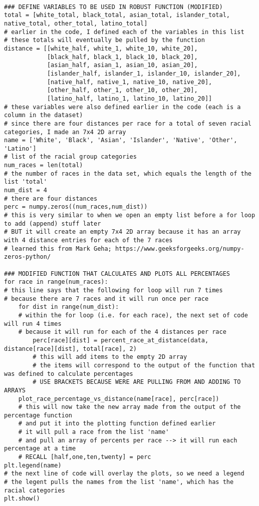 \documentclass[letterpaper]{article}
\begin{document}
\lstset{language=Python}
\begin{lstlisting}[frame=single]

### DEFINE VARIABLES TO BE USED IN ROBUST FUNCTION (MODIFIED)
total = [white_total, black_total, asian_total, islander_total, native_total, other_total, latino_total]
# earlier in the code, I defined each of the variables in this list
# these totals will eventually be pulled by the function
distance = [[white_half, white_1, white_10, white_20],
            [black_half, black_1, black_10, black_20],
            [asian_half, asian_1, asian_10, asian_20],
            [islander_half, islander_1, islander_10, islander_20],
            [native_half, native_1, native_10, native_20],
            [other_half, other_1, other_10, other_20],
            [latino_half, latino_1, latino_10, latino_20]]
# these variables were also defined earlier in the code (each is a column in the dataset)
# since there are four distances per race for a total of seven racial categories, I made an 7x4 2D array
name = ['White', 'Black', 'Asian', 'Islander', 'Native', 'Other', 'Latino']
# list of the racial group categories
num_races = len(total)
# the number of races in the data set, which equals the length of the list 'total'
num_dist = 4
# there are four distances
perc = numpy.zeros((num_races,num_dist))
# this is very similar to when we open an empty list before a for loop to add (append) stuff later
# BUT it will create an empty 7x4 2D array because it has an array with 4 distance entries for each of the 7 races
# learned this from Mark Geha; https://www.geeksforgeeks.org/numpy-zeros-python/

### MODIFIED FUNCTION THAT CALCULATES AND PLOTS ALL PERCENTAGES
for race in range(num_races):
# this line says that the following for loop will run 7 times
# because there are 7 races and it will run once per race
    for dist in range(num_dist):
    # within the for loop (i.e. for each race), the next set of code will run 4 times
    # because it will run for each of the 4 distances per race
        perc[race][dist] = percent_race_at_distance(data, distance[race][dist], total[race], 2)
        # this will add items to the empty 2D array
        # the items will correspond to the output of the function that was defined to calculate percentages
        # USE BRACKETS BECAUSE WERE ARE PULLING FROM AND ADDING TO ARRAYS
    plot_race_percentage_vs_distance(name[race], perc[race])
    # this will now take the new array made from the output of the percentage function
    # and put it into the plotting function defined earlier
    # it will pull a race from the list 'name'
    # and pull an array of percents per race --> it will run each percentage at a time
    # RECALL [half,one,ten,twenty] = perc
plt.legend(name)
# the next line of code will overlay the plots, so we need a legend
# the legent pulls the names from the list 'name', which has the racial categories
plt.show()

\end{lstlisting}
\end{document}
